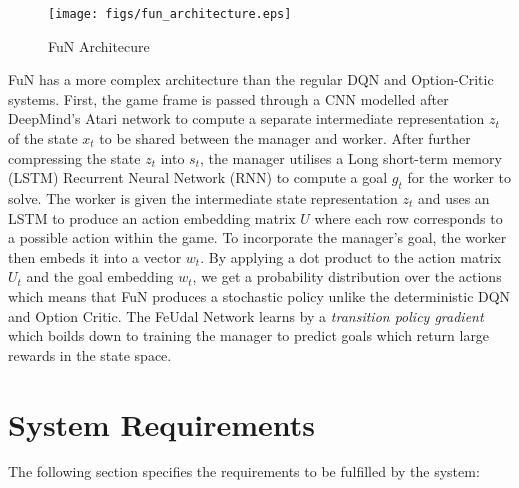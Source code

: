 \documentclass[notitlepage,a4paper,11pt]{article}
\begin{document}
\begin{figure}
	\begin{center}
		\texttt{[image: figs/fun\_architecture.eps]}
	\end{center}
	\caption{FuN Architecure \protect\cite{vezhnevets2017feudal}} \label{fig:4}
\end{figure}


FuN has a more complex architecture than the regular DQN and Option-Critic systems. First, the game frame is passed through a CNN modelled after DeepMind's Atari \cite{DBLP:journals/corr/MnihKSGAWR13} network to compute a separate intermediate representation $z_t$ of the state $x_t$ to be shared between the manager and worker. After further compressing the state $z_t$ into $s_t$, the manager utilises a Long short-term memory (LSTM) Recurrent Neural Network (RNN) to compute a goal $g_t$ for the worker to solve. The worker is given the intermediate state representation $z_t$ and uses an LSTM to produce an action embedding matrix $U$ where each row corresponds to a possible action within the game. To incorporate the manager's goal, the worker then embeds it into a vector $w_t$. By applying a dot product to the action matrix $U_t$ and the goal embedding $w_t$, we get a probability distribution over the actions which means that FuN produces a stochastic policy unlike the deterministic DQN and Option Critic. The FeUdal Network learns by a \textit{transition policy gradient} which boilds down to training the manager to predict goals which return large rewards in the state space. 

\section{System Requirements}

The following section specifies the requirements to be fulfilled by the system:
\end{document}
